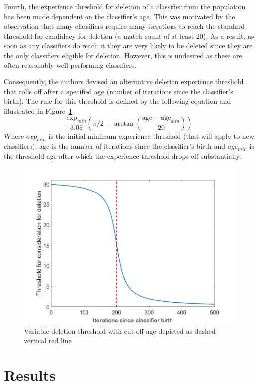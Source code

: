 \documentclass[11pt]{article}
\begin{document}
Fourth, the experience threshold for deletion of a classifier from the population has been made dependent on the classifier's age. This was motivated by the observation that many classifiers require many iterations to reach the standard threshold for candidacy for deletion (a match count of at least 20). As a result, as soon as any classifiers do reach it they are very likely to be deleted since they are the only classifiers eligible for deletion. However, this is undesired as these are often reasonably well-performing classifiers.

Consequently, the authors devised an alternative deletion experience threshold that rolls off after a specified age (number of iterations since the classifier's birth). The rule for this threshold is defined by the following equation and illustrated in Figure~\ref{fig:deletionthreshold}
\[
	\frac{\textrm{exp}_{min}}{3.05}
	\left(
	\pi/2-\arctan\left(\frac{\textrm{age} - \textrm{age}_{min}}{20} \right) \right)
\]
Where $exp_{min}$ is the initial minimum experience threshold (that will apply to new classifiers), age is the number of iterations since the classifier's birth and $age_{min}$ is the threshold age after which the experience threshold drops off substantially.

\begin{figure}[!htbp]
	\centering
	\includegraphics[width=0.7\linewidth]{figures/deletionThreshold.png}
	\caption{Variable deletion threshold with cut-off age depicted as dashed vertical red line}
	\label{fig:deletionthreshold}
\end{figure}



\section{Results}
\end{document}
